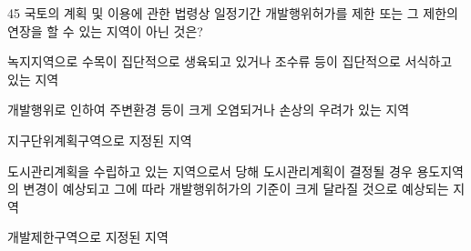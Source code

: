 \begin{question}{45}
국토의 계획 및 이용에 관한 법령상 일정기간 개발행위허가를 제한 또는 그 제한의 연장을 할 수 있는 지역이 아닌 것은?
\begin{choices}
  \item 녹지지역으로 수목이 집단적으로 생육되고 있거나 조수류 등이 집단적으로 서식하고 있는 지역
  \item 개발행위로 인하여 주변환경 등이 크게 오염되거나 손상의 우려가 있는 지역
  \item 지구단위계획구역으로 지정된 지역
  \item 도시관리계획을 수립하고 있는 지역으로서 당해 도시관리계획이 결정될 경우 용도지역의 변경이 예상되고 그에 따라 개발행위허가의 기준이 크게 달라질 것으로 예상되는 지역
  \item 개발제한구역으로 지정된 지역
\end{choices}
\end{question}
